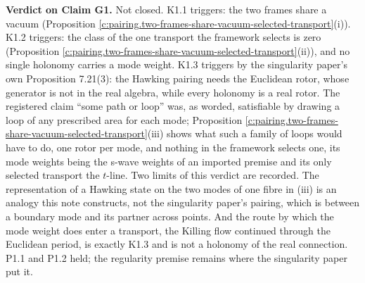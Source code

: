 \documentclass[11pt]{article}
\theoremstyle{definition}
\theoremstyle{plain}
\begin{document}
\label{c:note.pairing.setting-what-does-two-claims-2}
\textbf{Verdict on Claim G1.} Not closed. K1.1 triggers: the two frames share a vacuum (Proposition \ref{c:pairing.two-frames-share-vacuum-selected-transport}(i)). K1.2 triggers: the class of the one transport the framework selects is zero (Proposition \ref{c:pairing.two-frames-share-vacuum-selected-transport}(ii)), and no single holonomy carries a mode weight. K1.3 triggers by the singularity paper's own Proposition 7.21(3): the Hawking pairing needs the Euclidean rotor, whose generator is not in the real algebra, while every holonomy is a real rotor. The registered claim ``some path or loop'' was, as worded, satisfiable by drawing a loop of any prescribed area for each mode; Proposition \ref{c:pairing.two-frames-share-vacuum-selected-transport}(iii) shows what such a family of loops would have to do, one rotor per mode, and nothing in the framework selects one, its mode weights being the s-wave weights of an imported premise \cite[Prem.~8.1]{ButlerT5} and its only selected transport the $t$-line. Two limits of this verdict are recorded. The representation of a Hawking state on the two modes of one fibre in (iii) is an analogy this note constructs, not the singularity paper's pairing, which is between a boundary mode and its partner across points. And the route by which the mode weight does enter a transport, the Killing flow continued through the Euclidean period, is exactly K1.3 and is not a holonomy of the real connection. P1.1 and P1.2 held; the regularity premise remains where the singularity paper put it.
\end{document}
